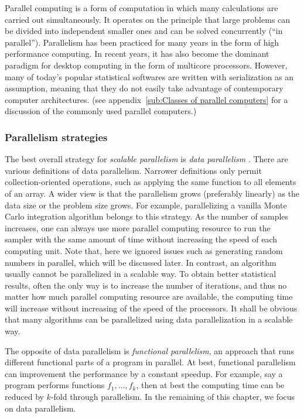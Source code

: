 Parallel computing is a form of computation in which many calculations are
carried out simultaneously. It operates on the principle that large problems
can be divided into independent smaller ones and can be solved concurrently
(``in parallel''). Parallelism has been practiced for many years in the form
of high performance computing. In recent years, it has also become the
dominant paradigm for desktop computing in the form of multicore processors.
However, many of today's popular statistical softwares are written with
serialization as an assumption, meaning that they do not easily take advantage
of contemporary computer architectures. (see appendix~\ref{sub:Classes of
  parallel computers} for a discussion of the commonly used parallel
computers.)

\subsubsection{Parallelism strategies}
\label{ssub:Parallelism strategies}

The best overall strategy for \emph{scalable parallelism} is \emph{data
  parallelism} \cite{datapar}. There are various definitions of data
parallelism. Narrower definitions only permit collection-oriented operations,
such as applying the same function to all elements of an array. A wider view
is that the parallelism grows (preferably linearly) as the data size or the
problem size grows. For example, parallelizing a vanilla Monte Carlo
integration algorithm belongs to this strategy. As the number of samples
increases, one can always use more parallel computing resource to run the
sampler with the same amount of time without increasing the speed of each
computing unit. Note that, here we ignored issues such as generating random
numbers in parallel, which will be discussed later. In contrast, an \mcmc
algorithm usually cannot be parallelized in a scalable way. To obtain better
statistical results, often the only way is to increase the number of
iterations, and thus no matter how much parallel computing resource are
available, the computing time will increase without increasing of the speed of
the processors. It shall be obvious that many \smc algorithms can be
parallelized using data parallelization in a scalable way.

The opposite of data parallelism is \emph{functional parallelism}, an approach
that runs different functional parts of a program in parallel. At best,
functional parallelism can improvement the performance by a constant speedup.
For example, say a program performs functions $f_1,\dots,f_k$, then at best
the computing time can be reduced by $k$-fold through parallelism. In the
remaining of this chapter, we focus on data parallelism.

